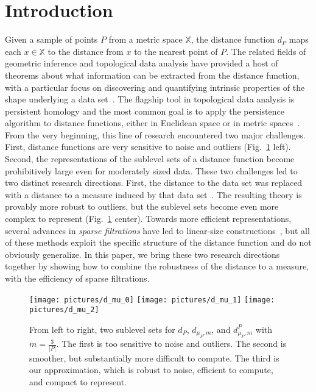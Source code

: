 \documentclass[a4paper]{article}
\newcommand\dmP{d_{\mu_P,m}}
\newcommand\dPP{d_{\mu_P,m}^P}
\newcommand\X{\mathbb{X}}
\begin{document}
\section{Introduction} Given a sample of points $P$ from a metric space $\X$, the distance function $d_P$ maps each $x\in \X$ to the distance from $x$ to the nearest point of $P$.
  The related fields of geometric inference and topological data analysis have provided a host of theorems about what information can be extracted from the distance function, with a particular focus on discovering and quantifying intrinsic properties of the shape underlying a data set~\cite{stcsesCCL,fhshcrsNSW}.
  The flagship tool in topological data analysis is persistent homology and the most common goal is to apply the persistence algorithm to distance functions, either in Euclidean space or in metric spaces~\cite{carlsson09topology,tpsELZ, cphCZ}.
  From the very beginning, this line of research encountered two major challenges.
  First, distance functions are very sensitive to noise and outliers (Fig.~\ref{fig:d_mu} left).
  Second, the representations of the sublevel sets of a distance function become prohibitively large even for moderately sized data.
  These two challenges led to two distinct research directions.
  First, the distance to the data set was replaced with a distance to a measure induced by that data set~\cite{gipmCCM}.
  The resulting theory is provably more robust to outliers, but the sublevel sets become even more complex to represent (Fig.~\ref{fig:d_mu} center).
  Towards more efficient representations, several advances in \emph{sparse filtrations} have led to linear-size constructions~\cite{ctpsmDFW,ZZZ,lsavrfS}, but all of these methods exploit the specific structure of the distance function and do not obviously generalize.
  In this paper, we bring these two research directions together by showing how to combine the robustness of the distance to a measure, with the efficiency of sparse filtrations.

  \begin{figure}[htbp]
    \centering
      \texttt{[image: pictures/d\_mu\_0]}
      \texttt{[image: pictures/d\_mu\_1]}
      \texttt{[image: pictures/d\_mu\_2]}
    \caption{From left to right, two sublevel sets for $d_P$, $\dmP$, and $\dPP$ with $m  = \frac{3}{|P|}$.
    The first is too sensitive to noise and outliers.
    The second is smoother, but substantially more difficult to compute.
    The third is our approximation, which is robust to noise, efficient to compute, and compact to represent.}
    \label{fig:d_mu}
  \end{figure}
\end{document}
